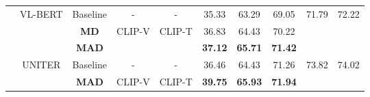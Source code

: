 \documentclass[runningheads]{llncs}
\begin{document}
\begin{table*}[h!]
{\begin{tabular}{lccccccccc}
\multicolumn{1}{|c|}{}                                                                                   & \multicolumn{1}{c|}{VL-BERT}                                                                 & \multicolumn{1}{c|}{Baseline}                             & \multicolumn{1}{c|}{-}                       & \multicolumn{1}{c|}{-}                       & 35.33                        & 63.29                         & \multicolumn{1}{c|}{69.05}          & \multicolumn{1}{c|}{71.79}             & \multicolumn{1}{c|}{72.22}             \\ \cline{3-5}
\multicolumn{1}{|c|}{}                                                                                   & \multicolumn{1}{c|}{}                                                                        & \multicolumn{1}{c|}{\textbf{MD}}                   & \multicolumn{1}{c|}{\multirow{2}{*}{CLIP-V}} & \multicolumn{1}{c|}{\multirow{2}{*}{CLIP-T}} & 36.83                        & 64.43                         & \multicolumn{1}{c|}{70.22}          & \multicolumn{1}{c|}{}                  & \multicolumn{1}{c|}{}                  \\ \cline{3-3}
\multicolumn{1}{|c|}{}                                                                                   & \multicolumn{1}{c|}{}                                                                        & \multicolumn{1}{c|}{\textbf{MAD}}                  & \multicolumn{1}{c|}{}                        & \multicolumn{1}{c|}{}                        & \textbf{37.12}               & \textbf{65.71}                & \multicolumn{1}{c|}{\textbf{71.42}} & \multicolumn{1}{c|}{}                  & \multicolumn{1}{c|}{}                  \\ \cline{2-10}
\multicolumn{1}{|c|}{}                                                                                   & \multicolumn{1}{c|}{UNITER}                                                                  & \multicolumn{1}{c|}{Baseline}                             & \multicolumn{1}{c|}{-}                       & \multicolumn{1}{c|}{-}                       & 36.46                        & 64.43                         & \multicolumn{1}{c|}{71.26}          & \multicolumn{1}{c|}{73.82}             & \multicolumn{1}{c|}{74.02}             \\ \cline{3-5}
\multicolumn{1}{|c|}{}                                                                                   & \multicolumn{1}{c|}{}                                                                        & \multicolumn{1}{c|}{\textbf{MAD}}                  & \multicolumn{1}{c|}{CLIP-V}                  & \multicolumn{1}{c|}{CLIP-T}                  & \textbf{39.75}               & \textbf{65.93}                & \multicolumn{1}{c|}{\textbf{71.94}} & \multicolumn{1}{c|}{}                  & \multicolumn{1}{c|}{}                  \\ \cline{2-10}

\end{tabular}}
\end{table*}
\end{document}
